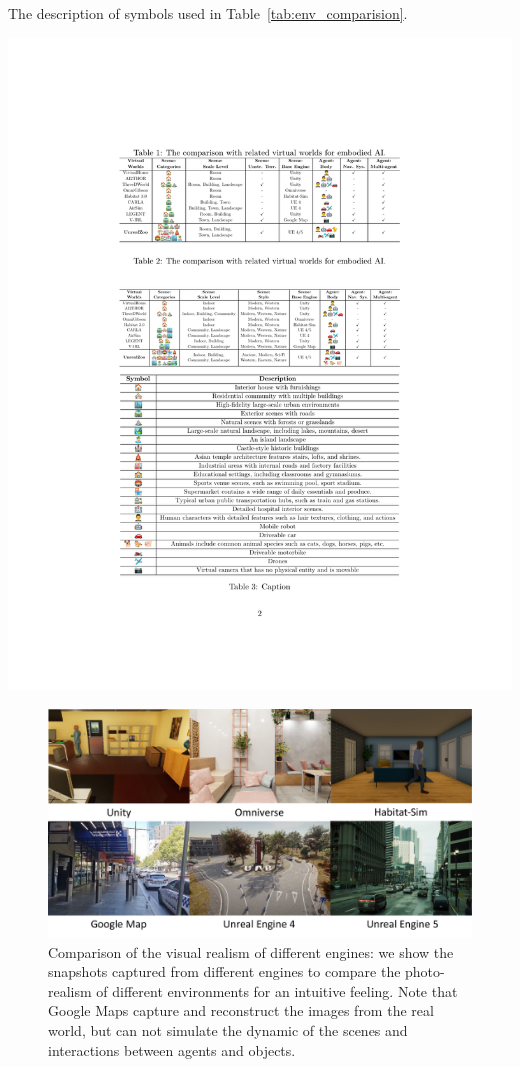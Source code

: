 \begin{table}[h]
\centering
\caption{The description of symbols used in Table~\ref{tab:env_comparision}.}
\vspace{-0.2cm}
\label{tab:symbol}
\includegraphics[width=0.9\linewidth]{image/emoji_description.pdf}
\end{table}


\begin{figure}[ht]
    \centering
    \includegraphics[width=0.9\linewidth]{image/visual_realism.pdf}
    \vspace{-0.3cm}
    \caption{Comparison of the visual realism of different engines: we show the snapshots captured from different engines to compare the photo-realism of different environments for an intuitive feeling. Note that Google Maps capture and reconstruct the images from the real world, but can not simulate the dynamic of the scenes and interactions between agents and objects.}
    \label{fig: visual_realism}
\end{figure}

